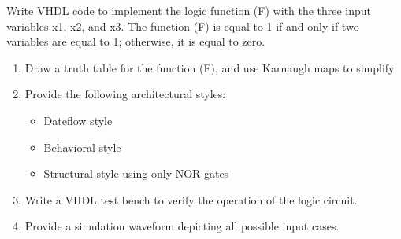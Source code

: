 \documentclass{article}
\begin{document}



\begin{Q}
    {
        Write VHDL code to implement the logic function (F) with the three input variables x1, x2,
        and x3. The function (F) is equal to 1 if and only if two variables are equal to 1; otherwise, it
        is equal to zero.
        \begin{enumerate}
            \item Draw a truth table for the function (F), and use Karnaugh maps to simplify
            \item   Provide the following architectural styles:
                  \begin{itemize}
                      \item Dateflow style
                      \item  Behavioral style
                      \item  Structural style using only NOR gates
                  \end{itemize}
            \item  Write a VHDL test bench to verify the operation of the logic circuit.
            \item Provide a simulation waveform depicting all possible input cases.
        \end{enumerate}
    }
\end{Q}
\end{document}
